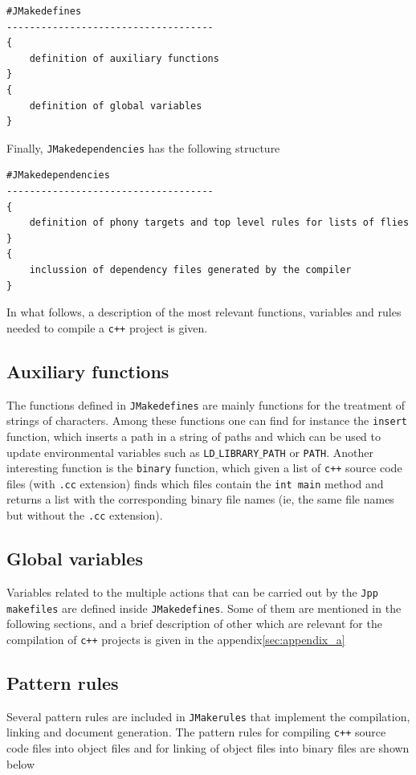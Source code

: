 \documentclass[t]{article}
\begin{document}
\begin{lstlisting}
#JMakedefines
------------------------------------
{
	definition of auxiliary functions
}
{
	definition of global variables
}
\end{lstlisting}
Finally, {\tt JMakedependencies} has the following structure

\begin{lstlisting}
#JMakedependencies
------------------------------------
{
	definition of phony targets and top level rules for lists of flies
}
{
	inclussion of dependency files generated by the compiler
}
\end{lstlisting}
In what follows, a description of the most relevant functions, variables and rules needed to compile a {\tt c++} project is given. 
\subsection{Auxiliary functions}
The functions defined in {\tt JMakedefines} are mainly functions for the treatment of strings of characters. Among these functions one can find for instance the {\tt insert} function, which inserts a path in a string of paths and which can be used to update environmental variables such as {\tt LD$\_$LIBRARY$\_$PATH} or {\tt PATH}. Another interesting function is the {\tt binary} function, which given a list of {\tt c++} source code files (with {\tt .cc} extension) finds which files contain the {\tt int main} method and returns a list with the corresponding binary file names (ie, the same file names but without the {\tt .cc} extension).  
\subsection{Global variables}
Variables related to the multiple actions that can be carried out by the {\tt Jpp makefiles} are defined inside {\tt JMakedefines}. Some of them are mentioned in the following sections, and a brief description of other which are relevant for the compilation of {\tt c++} projects is given in the appendix\ref{sec:appendix_a}
\subsection{Pattern rules}
Several pattern rules are included in {\tt JMakerules} that implement the compilation, linking and document generation. The pattern rules for compiling {\tt c++} source code files into object files and for linking of object files into binary files are shown below 
\end{document}
